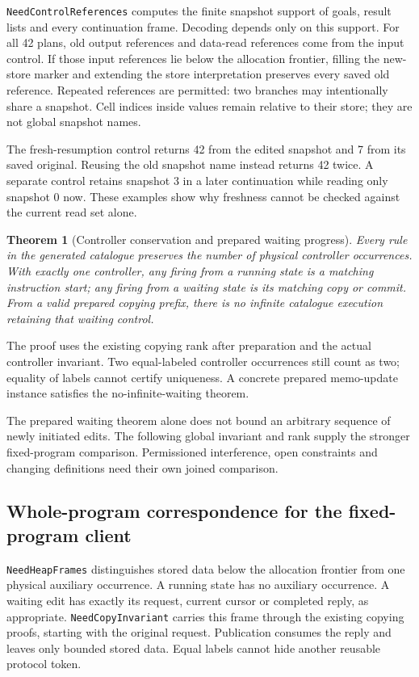 \documentclass[11pt]{article}
\newtheorem{theorem}{Theorem}
\newcommand{\code}[1]{\texttt{\small #1}}
\begin{document}
\code{NeedControlReferences} computes the finite snapshot support of
goals, result lists and every continuation frame. Decoding depends only on
this support. For all 42 plans, old output references and data-read
references come from the input control. If those input references lie below
the allocation frontier, filling the new-store marker and extending the
store interpretation preserves every saved old reference. Repeated
references are permitted: two branches may intentionally share a snapshot.
Cell indices inside values remain relative to their store; they are not
global snapshot names.

The fresh-resumption control returns 42 from the edited snapshot and 7
from its saved original. Reusing the old snapshot name instead returns 42
twice. A separate control retains snapshot 3 in a later continuation while
reading only snapshot 0 now. These examples show why freshness cannot be
checked against the current read set alone.

\begin{theorem}[Controller conservation and prepared waiting progress]
Every rule in the generated catalogue preserves the number of physical
controller occurrences. With exactly one controller, any firing from a
running state is a matching instruction start; any firing from a waiting
state is its matching copy or commit. From a valid prepared copying prefix,
there is no infinite catalogue execution retaining that waiting control.
\end{theorem}
The proof uses the existing copying rank after preparation and the actual
controller invariant. Two equal-labeled controller occurrences still count
as two; equality of labels cannot certify uniqueness. A concrete prepared
memo-update instance satisfies the no-infinite-waiting theorem.

The prepared waiting theorem alone does not bound an arbitrary sequence of
newly initiated edits. The following global invariant and rank supply the
stronger fixed-program comparison. Permissioned interference, open
constraints and changing definitions need their own joined comparison.

\subsection{Whole-program correspondence for the fixed-program client}

\code{NeedHeapFrames} distinguishes stored data below the allocation
frontier from one physical auxiliary occurrence. A running state has no
auxiliary occurrence. A waiting edit has exactly its request, current cursor
or completed reply, as appropriate. \code{NeedCopyInvariant} carries this
frame through the existing copying proofs, starting with the original
request. Publication consumes the reply and leaves only bounded stored
data. Equal labels cannot hide another reusable protocol token.
\end{document}
